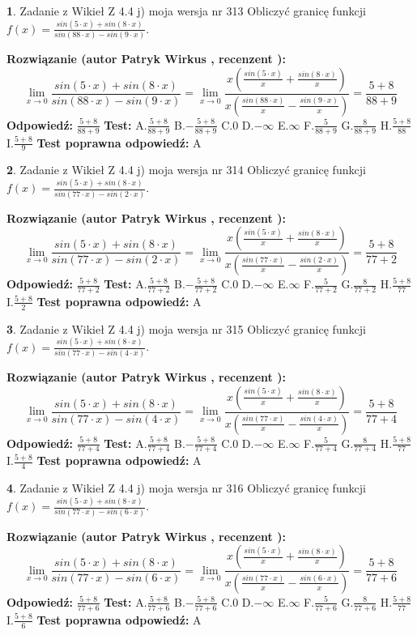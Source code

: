 \documentclass[12pt, a4paper]{article}
\theoremstyle{definition} %
\newtheorem{zad}{}
\newcommand{\zadStart}[1]{\begin{zad}#1\newline}
\newcommand{\zadStop}{\end{zad}}
\newcommand{\rozwStart}[2]{\noindent \textbf{Rozwiązanie (autor #1 , recenzent #2): }\newline}
\newcommand{\rozwStop}{\newline}
\newcommand{\odpStart}{\noindent \textbf{Odpowiedź:}\newline}
\newcommand{\odpStop}{\newline}
\newcommand{\testStart}{\noindent \textbf{Test:}\newline}
\newcommand{\testStop}{\newline}
\newcommand{\kluczStart}{\noindent \textbf{Test poprawna odpowiedź:}\newline}
\newcommand{\kluczStop}{\newline}
\begin{document}
\zadStart{Zadanie z Wikieł Z 4.4 j) moja wersja nr 313}
Obliczyć granicę funkcji $f(x)=\frac{sin(5\cdot x) +sin(8\cdot x)}{sin(88\cdot x) -sin(9\cdot x)}$.
\zadStop
\rozwStart{Patryk Wirkus}{}
$$\lim\limits_{x\to 0}\frac{sin(5\cdot x) +sin(8\cdot x)}{sin(88\cdot x) -sin(9\cdot x)}=\lim\limits_{x\to 0}\frac{x(\frac{sin(5\cdot x)}{x}+\frac{sin(8\cdot x)}{x})}{x(\frac{sin(88\cdot x)}{x}-\frac{sin(9\cdot x)}{x})}=\frac{5+8}{88+9}$$
\rozwStop
\odpStart
$\frac{5+8}{88+9}$
\odpStop
\testStart
A.$\frac{5+8}{88+9}$
B.$-\frac{5+8}{88+9}$
C.$0$
D.$-\infty$
E.$\infty$
F.$\frac{5}{88+9}$
G.$\frac{8}{88+9}$
H.$\frac{5+8}{88}$
I.$\frac{5+8}{9}$
\testStop
\kluczStart
A
\kluczStop



\zadStart{Zadanie z Wikieł Z 4.4 j) moja wersja nr 314}
Obliczyć granicę funkcji $f(x)=\frac{sin(5\cdot x) +sin(8\cdot x)}{sin(77\cdot x) -sin(2\cdot x)}$.
\zadStop
\rozwStart{Patryk Wirkus}{}
$$\lim\limits_{x\to 0}\frac{sin(5\cdot x) +sin(8\cdot x)}{sin(77\cdot x) -sin(2\cdot x)}=\lim\limits_{x\to 0}\frac{x(\frac{sin(5\cdot x)}{x}+\frac{sin(8\cdot x)}{x})}{x(\frac{sin(77\cdot x)}{x}-\frac{sin(2\cdot x)}{x})}=\frac{5+8}{77+2}$$
\rozwStop
\odpStart
$\frac{5+8}{77+2}$
\odpStop
\testStart
A.$\frac{5+8}{77+2}$
B.$-\frac{5+8}{77+2}$
C.$0$
D.$-\infty$
E.$\infty$
F.$\frac{5}{77+2}$
G.$\frac{8}{77+2}$
H.$\frac{5+8}{77}$
I.$\frac{5+8}{2}$
\testStop
\kluczStart
A
\kluczStop



\zadStart{Zadanie z Wikieł Z 4.4 j) moja wersja nr 315}
Obliczyć granicę funkcji $f(x)=\frac{sin(5\cdot x) +sin(8\cdot x)}{sin(77\cdot x) -sin(4\cdot x)}$.
\zadStop
\rozwStart{Patryk Wirkus}{}
$$\lim\limits_{x\to 0}\frac{sin(5\cdot x) +sin(8\cdot x)}{sin(77\cdot x) -sin(4\cdot x)}=\lim\limits_{x\to 0}\frac{x(\frac{sin(5\cdot x)}{x}+\frac{sin(8\cdot x)}{x})}{x(\frac{sin(77\cdot x)}{x}-\frac{sin(4\cdot x)}{x})}=\frac{5+8}{77+4}$$
\rozwStop
\odpStart
$\frac{5+8}{77+4}$
\odpStop
\testStart
A.$\frac{5+8}{77+4}$
B.$-\frac{5+8}{77+4}$
C.$0$
D.$-\infty$
E.$\infty$
F.$\frac{5}{77+4}$
G.$\frac{8}{77+4}$
H.$\frac{5+8}{77}$
I.$\frac{5+8}{4}$
\testStop
\kluczStart
A
\kluczStop



\zadStart{Zadanie z Wikieł Z 4.4 j) moja wersja nr 316}
Obliczyć granicę funkcji $f(x)=\frac{sin(5\cdot x) +sin(8\cdot x)}{sin(77\cdot x) -sin(6\cdot x)}$.
\zadStop
\rozwStart{Patryk Wirkus}{}
$$\lim\limits_{x\to 0}\frac{sin(5\cdot x) +sin(8\cdot x)}{sin(77\cdot x) -sin(6\cdot x)}=\lim\limits_{x\to 0}\frac{x(\frac{sin(5\cdot x)}{x}+\frac{sin(8\cdot x)}{x})}{x(\frac{sin(77\cdot x)}{x}-\frac{sin(6\cdot x)}{x})}=\frac{5+8}{77+6}$$
\rozwStop
\odpStart
$\frac{5+8}{77+6}$
\odpStop
\testStart
A.$\frac{5+8}{77+6}$
B.$-\frac{5+8}{77+6}$
C.$0$
D.$-\infty$
E.$\infty$
F.$\frac{5}{77+6}$
G.$\frac{8}{77+6}$
H.$\frac{5+8}{77}$
I.$\frac{5+8}{6}$
\testStop
\kluczStart
A
\kluczStop
\end{document}
